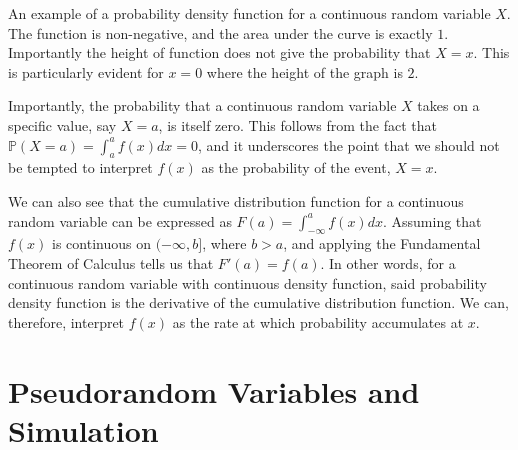 \documentclass[../book.tex]{subfiles}
\begin{document}
An example of a probability density function for a continuous random variable \(X\). The function is non-negative, and the area under the curve is exactly \(1\). Importantly the height of function does not give the probability that \(X=x\). This is particularly evident for \(x=0\) where the height of the graph is \(2\).

Importantly, the probability that a continuous random variable \(X\) takes on a specific value, say \(X=a\), is itself zero. This follows from the fact that \(\mathbb{P}( X=a )=\int_a^a f(x) dx = 0\), and it underscores the point that we should not be tempted to interpret \(f(x)\) as the probability of the event, \(X=x\).

We can also see that the cumulative distribution function for a continuous random variable can be expressed as \(F(a) = \int_{-\infty}^a f(x) dx\). Assuming that \(f(x)\) is continuous on \((-\infty, b]\), where \(b>a\), and applying the Fundamental Theorem of Calculus tells us that \(F'(a) = f(a)\). In other words, for a continuous random variable with continuous density function, said probability density function is the derivative of the cumulative distribution function. We can, therefore, interpret \(f(x)\) as the rate at which probability accumulates at \(x\).

\section{Pseudorandom Variables and Simulation}
\end{document}
